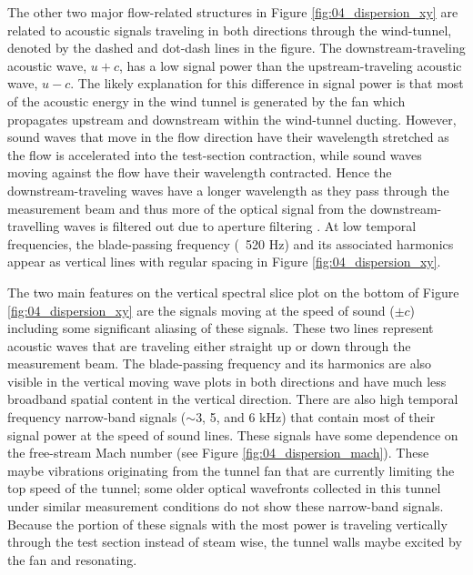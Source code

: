 The other two major flow-related structures in Figure \ref{fig:04_dispersion_xy} are related to acoustic signals traveling in both directions through the wind-tunnel, denoted by the dashed and dot-dash lines in the figure.
The downstream-traveling acoustic wave, $u+c$, has a low signal power than the upstream-traveling acoustic wave, $u-c$.
The likely explanation for this difference in signal power is that most of the acoustic energy in the wind tunnel is generated by the fan which propagates upstream and downstream within the wind-tunnel ducting.
However, sound waves that move in the flow direction have their wavelength stretched as the flow is accelerated into the test-section contraction, while sound waves moving against the flow have their wavelength contracted.
Hence the downstream-traveling waves have a longer wavelength as they pass through the measurement beam and thus more of the optical signal from the downstream-travelling waves is filtered out due to aperture filtering \cite{Siegenthaler-2008-9Yutbt6c}.
At low temporal frequencies, the blade-passing frequency (~520 Hz) and its associated harmonics appear as vertical lines with regular spacing in Figure \ref{fig:04_dispersion_xy}.

The two main features on the vertical spectral slice plot on the bottom of Figure \ref{fig:04_dispersion_xy} are the signals moving at the speed of sound ($\pm c$) including some significant aliasing of these signals.
These two lines represent acoustic waves that are traveling either straight up or down through the measurement beam.
The blade-passing frequency and its harmonics are also visible in the vertical moving wave plots in both directions and have much less broadband spatial content in the vertical direction.
There are also high temporal frequency narrow-band signals ($\sim$3, 5, and 6 kHz) that contain most of their signal power at the speed of sound lines.
These signals have some dependence on the free-stream Mach number (see Figure \ref{fig:04_dispersion_mach}).
These maybe vibrations originating from the tunnel fan that are currently limiting the top speed of the tunnel; some older optical wavefronts collected in this tunnel under similar measurement conditions do not show these narrow-band signals.
Because the portion of these signals with the most power is traveling vertically through the test section instead of steam wise, the tunnel walls maybe excited by the fan and resonating.

